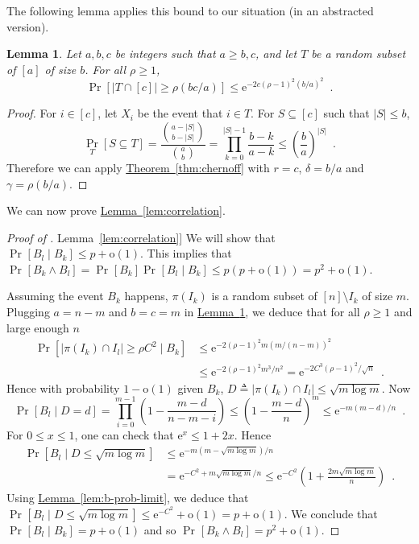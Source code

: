 \documentclass[11pt]{article}
\numberwithin{equation}{section}
\newtheorem{lemma}[theorem]{Lemma}
\theoremstyle{definition}
\theoremstyle{plain}
\newcommand{\eee}{\mathrm e}
\newcommand{\expref}[2]{\hyperref[#2]{#1~\ref{#2}}}
\theoremstyle{plain}
\theoremstyle{definition}
\newcommand{\littleoh}[1]{\mathrm{o} ( #1 )}
\newcommand{\prob}[2][]{\Pr_{#1} [ #2 ]}
\newcommand{\condprob}[3][]{\prob[#1]{#2  \mid  #3}}
\newcommand{\eqperiod}{\enspace .}
\newcommand{\eqdef}{\triangleq}
\begin{document}
%

The following lemma applies this bound to our situation (in an abstracted version).

\begin{lemma} \label{lem:prob-est}
 Let $a,b,c$ be integers such that $a \geq b,c$, and let $T$ be a random subset of $[a]$ of size $b$. For all $\rho \geq 1$,
 \begin{equation*}
  \prob{|T \cap [c]| \geq \rho (bc/a)} \leq \eee^{-2c(\rho-1)^2(b/a)^2} \eqperiod
 \end{equation*}
\end{lemma}
\begin{proof}
 For $i \in [c]$, let $X_i$ be the event that $i \in T$. For $S \subseteq [c]$ such that $|S| \leq b$,
\begin{equation}
 \prob[T]{S \subseteq T} = \frac{\binom{a-|S|}{b-|S|}}{\binom{a}{b}} =
 \prod_{k=0}^{|S|-1} \frac{b-k}{a-k} \leq \left(\frac{b}{a}\right)^{|S|} \eqperiod
\end{equation}
 Therefore we can apply \expref{Theorem}{thm:chernoff} with $r = c$, $\delta = b/a$ and $\gamma = \rho(b/a)$.
\end{proof}

We can now prove \expref{Lemma}{lem:correlation}.

\begin{proof}[Proof of \expref{Lemma}{lem:correlation}]
 We will show that $\condprob{B_l}{B_k} \leq p + \littleoh{1}$. This implies that $\prob{B_k \land B_l} = \prob{B_k} \condprob{B_l}{B_k} \leq p(p + \littleoh{1}) = p^2 + \littleoh{1}$.

 Assuming the event $B_k$ happens, $\pi(I_k)$ is a random subset of $[n] \setminus I_k$ of size $m$. Plugging $a = n-m$ and $b = c = m$ in \expref{Lemma}{lem:prob-est}, we deduce that for all $\rho \geq 1$ and large enough $n$
 \begin{align}
  \condprob{|\pi(I_k) \cap I_l| \geq \rho C^2}{B_k} &\leq \eee^{-2(\rho-1)^2m(m/(n-m))^2} \\&\leq \eee^{-2(\rho-1)^2 m^3/n^2} = \eee^{-2C^3(\rho-1)^2/\sqrt{n}} \eqperiod
 \end{align}
 Hence with probability $1-\littleoh{1}$ given $B_k$, $D \eqdef |\pi(I_k) \cap I_l| \leq \sqrt{m\log m}$. Now
\begin{equation}
 \condprob{B_l}{D=d} = \prod_{i=0}^{m-1} \left(1 - \frac{m-d}{n-m-i}\right) \leq \left(1 - \frac{m-d}{n}\right)^m \leq \eee^{-m(m-d)/n} \eqperiod
\end{equation}
%
%
 For $0 \leq x \leq 1$, one can check that $\eee^x \leq 1 + 2x$. Hence
\begin{align}
 \condprob{B_l}{D \leq \sqrt{m\log m}} &\leq \eee^{-m(m-\sqrt{m\log m})/n} \\ &= \eee^{-C^2+m\sqrt{m\log m}/n} \leq \eee^{-C^2} \left(1 + \frac{2m\sqrt{m\log m}}{n}\right) \eqperiod
\end{align}
 Using \expref{Lemma}{lem:b-prob-limit}, we deduce that $\condprob{B_l}{D \leq \sqrt{m\log m}} \leq \eee^{-C^2} + \littleoh{1} = p + \littleoh{1}$.
 We conclude that $\condprob{B_l}{B_k} = p + \littleoh{1}$ and so $\prob{B_k \land B_l} = p^2 + \littleoh{1}$.
\end{proof}
\end{document}
